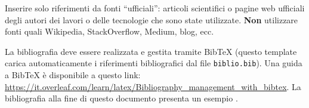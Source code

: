 Inserire solo riferimenti da fonti ``ufficiali'': articoli scientifici o pagine web ufficiali degli autori dei lavori o delle tecnologie che sono state utilizzate. \textbf{Non} utilizzare fonti quali Wikipedia, StackOverflow, Medium, blog, ecc.

La bibliografia deve essere realizzata e gestita tramite BibTeX (questo template carica automaticamente i riferimenti bibliografici dal file \texttt{biblio.bib}). Una guida a BibTeX è disponibile a questo link: \url{https://it.overleaf.com/learn/latex/Bibliography_management_with_bibtex}. La bibliografia alla fine di questo documento presenta un esempio \cite{esempio_citazione}.